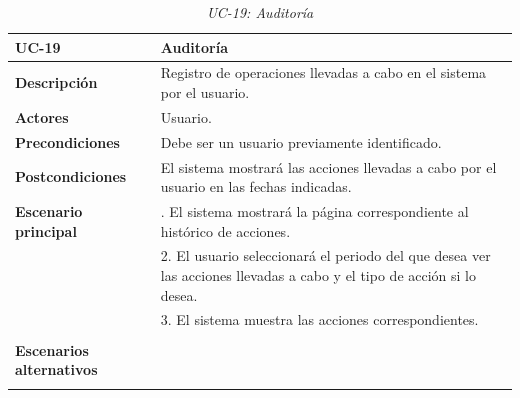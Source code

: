 \begin{table}
  \begin{center}
    \begin{tabularx}{16.4cm}{|l|X|}
      \hline
      \textbf{UC-19} & \textbf{Auditoría}\\
      \hline
      \textbf{Descripción} & Registro de operaciones llevadas a cabo en el sistema por el usuario.\\
      \hline
      \textbf{Actores} & Usuario.\\
      \hline
      \textbf{Precondiciones} & Debe ser un usuario previamente identificado.\\
      \hline
      \textbf{Postcondiciones} & El sistema mostrará las acciones llevadas a cabo por el usuario en las fechas indicadas.\\
      \hline
      \textbf{Escenario principal} & \smallskip 1. El sistema mostrará la página correspondiente al histórico de acciones.\\
      & 2. El usuario seleccionará el periodo del que desea ver las acciones llevadas a cabo y el tipo de acción si lo desea.\\
      & 3. El sistema muestra las acciones correspondientes.\\
      & \\
      \hline
      \textbf{Escenarios alternativos} & \\
      & \\
      \hline
    \end{tabularx}
    \caption{\textit{UC-19: Auditoría}}
    \label{tab:CU-auditorias}
  \end{center}
\end{table}


